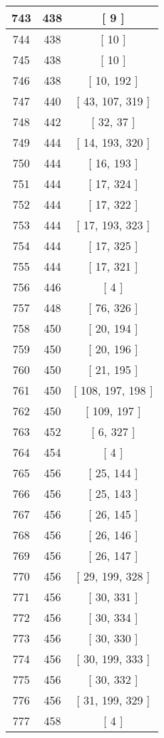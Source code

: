 \begin{center}
\begin{longtable}[H]{|| c c c ||}
\hline
743 & 438 & [ 9 ] \\ 
\hline
744 & 438 & [ 10 ] \\ 
\hline
745 & 438 & [ 10 ] \\ 
\hline
746 & 438 & [ 10, 192 ] \\ 
\hline
747 & 440 & [ 43, 107, 319 ] \\ 
\hline
748 & 442 & [ 32, 37 ] \\ 
\hline
749 & 444 & [ 14, 193, 320 ] \\ 
\hline
750 & 444 & [ 16, 193 ] \\ 
\hline
751 & 444 & [ 17, 324 ] \\ 
\hline
752 & 444 & [ 17, 322 ] \\ 
\hline
753 & 444 & [ 17, 193, 323 ] \\ 
\hline
754 & 444 & [ 17, 325 ] \\ 
\hline
755 & 444 & [ 17, 321 ] \\ 
\hline
756 & 446 & [ 4 ] \\ 
\hline
757 & 448 & [ 76, 326 ] \\ 
\hline
758 & 450 & [ 20, 194 ] \\ 
\hline
759 & 450 & [ 20, 196 ] \\ 
\hline
760 & 450 & [ 21, 195 ] \\ 
\hline
761 & 450 & [ 108, 197, 198 ] \\ 
\hline
762 & 450 & [ 109, 197 ] \\ 
\hline
763 & 452 & [ 6, 327 ] \\ 
\hline
764 & 454 & [ 4 ] \\ 
\hline
765 & 456 & [ 25, 144 ] \\ 
\hline
766 & 456 & [ 25, 143 ] \\ 
\hline
767 & 456 & [ 26, 145 ] \\ 
\hline
768 & 456 & [ 26, 146 ] \\ 
\hline
769 & 456 & [ 26, 147 ] \\ 
\hline
770 & 456 & [ 29, 199, 328 ] \\ 
\hline
771 & 456 & [ 30, 331 ] \\ 
\hline
772 & 456 & [ 30, 334 ] \\ 
\hline
773 & 456 & [ 30, 330 ] \\ 
\hline
774 & 456 & [ 30, 199, 333 ] \\ 
\hline
775 & 456 & [ 30, 332 ] \\ 
\hline
776 & 456 & [ 31, 199, 329 ] \\ 
\hline
777 & 458 & [ 4 ] \\ 

\end{longtable}
\end{center}
